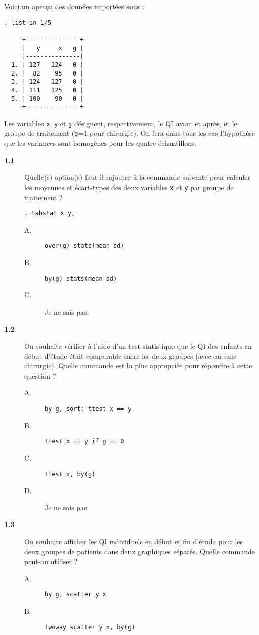 Voici un aperçu des données importées sous \Stata :
\begin{verbatim}
. list in 1/5

     +---------------+
     |   y     x   g |
     |---------------|
  1. | 127   124   0 |
  2. |  82    95   0 |
  3. | 124   127   0 |
  4. | 111   125   0 |
  5. | 100    90   0 |
     +---------------+
\end{verbatim}
Les variables \texttt{x}, \texttt{y} et \texttt{g} désignent,
respectivement, le QI avant et après, et le groupe de traitement
(\texttt{g}=1 pour chirurgie). On fera dans tous les cas l'hypothèse que les
variances sont homogènes pour les quatre échantillons.
\begin{description}
\item[\bf 1.1] Quelle(s) option(s) faut-il rajouter à la commande suivante
  pour calculer les moyennes et écart-types des deux variables \texttt{x} et
  \texttt{y} par groupe de traitement ? 
\begin{verbatim}
. tabstat x y, 
\end{verbatim}
\begin{description}
\item[A.] \verb|over(g) stats(mean sd)|
\item[B.] \verb|by(g) stats(mean sd)|
\item[C.] Je ne sais pas.
\end{description}
\item[\bf 1.2] On souhaite vérifier à l'aide d'un test statistique que le QI
  des enfants en début d'étude était comparable entre les deux groupes (avec
  ou sans chirurgie). Quelle commande est la plus appropriée pour répondre à
  cette question ?  
\begin{description}
\item[A.] \verb|by g, sort: ttest x == y|
\item[B.] \verb|ttest x == y if g == 0|
\item[C.] \verb|ttest x, by(g)|
\item[D.] Je ne sais pas.
\end{description}
\item[\bf 1.3] On souhaite afficher les QI individuels en début et fin
  d'étude pour les deux groupes de patients dans deux graphiques
  séparés. Quelle commande peut-on utiliser ? 
\begin{description}
\item[A.] \verb|by g, scatter y x|
\item[B.] \verb|twoway scatter y x, by(g)|

\end{description}
\end{description}
